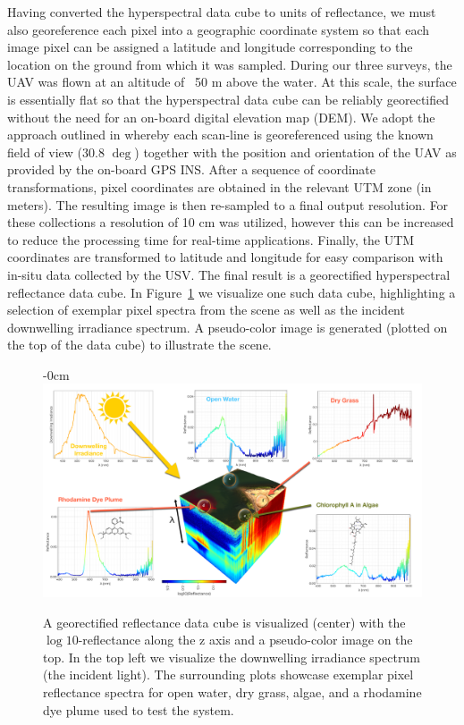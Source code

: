 \documentclass[journal,article,submit,pdftex,moreauthors]{Definitions/mdpi}
\begin{document}
Having converted the hyperspectral data cube to units of reflectance, we must also georeference each pixel into a geographic coordinate system so that each image pixel can be assigned a latitude and longitude corresponding to the location on the ground from which it was sampled. During our three surveys, the UAV was flown at an altitude of ~50 m above the water. At this scale, the surface is essentially flat so that the hyperspectral data cube can be reliably georectified without the need for an on-board digital elevation map (DEM). We adopt the approach outlined in \cite{GeorectificationMuller, GeorectificationBaumker, GeorectificationMostafa} whereby each scan-line is georeferenced using the known field of view (30.8 $\deg$) together with the position and orientation of the UAV as provided by the on-board GPS INS. After a sequence of coordinate transformations, pixel coordinates are obtained in the relevant UTM zone (in meters). The resulting image is then re-sampled to a final output resolution. For these collections a resolution of 10 cm was utilized, however this can be increased to reduce the processing time for real-time applications. Finally, the UTM coordinates are transformed to latitude and longitude for easy comparison with in-situ data collected by the USV. The final result is a georectified hyperspectral reflectance data cube. In Figure~\ref{fig:hsi-infographic} we visualize one such data cube, highlighting a selection of exemplar pixel spectra from the scene as well as the incident downwelling irradiance spectrum. A pseudo-color image is generated (plotted on the top of the data cube) to illustrate the scene.

\begin{figure}[H]
\begin{adjustwidth}{-\extralength}{0cm}
\centering
\includegraphics[width=15.5cm]{paper/figures/materials-and-methods/HyperSpectralInfoGraphic.pdf}
\end{adjustwidth}
\caption{A georectified reflectance data cube is visualized (center) with the $\log10$-reflectance along the z axis and a pseudo-color image on the top. In the top left we visualize the downwelling irradiance spectrum (the incident light). The surrounding plots showcase exemplar pixel reflectance spectra for open water, dry grass, algae, and a rhodamine dye plume used to test the system.\label{fig:hsi-infographic}}
\end{figure}  
\end{document}
